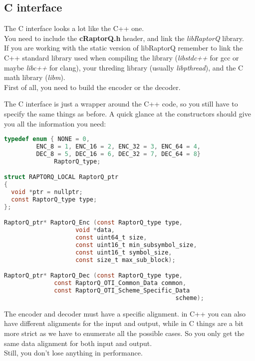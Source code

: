 \documentclass[11pt,a4paper]{refart}
\begin{document}
\subsection{C interface}
The C interface looks a lot like the C++ one.\\
You need to include the \textbf{cRaptorQ.h} header, and link the \textit{libRaptorQ} library.\\
If you are working with the static version of libRaptorQ remember to link the C++ standard library used when
compiling the library (\textit{libstdc++} for gcc or maybe \textit{libc++} for clang), your threding library (usually \textit{libpthread}), and the C math library (\textit{libm}).\\

First of all, you need to build the encoder or the decoder.

The C interface is just a wrapper around the C++ code, so you still have to specify the same things as before.
A quick glance at the constructors should give you all the information you need:

\begin{lstlisting}[language=C]
typedef enum { NONE = 0,
         ENC_8 = 1, ENC_16 = 2, ENC_32 = 3, ENC_64 = 4,
         DEC_8 = 5, DEC_16 = 6, DEC_32 = 7, DEC_64 = 8}
              RaptorQ_type;

struct RAPTORQ_LOCAL RaptorQ_ptr
{
  void *ptr = nullptr;
  const RaptorQ_type type;
};

RaptorQ_ptr* RaptorQ_Enc (const RaptorQ_type type,
                    void *data,
                    const uint64_t size,
                    const uint16_t min_subsymbol_size,
                    const uint16_t symbol_size,
                    const size_t max_sub_block);

RaptorQ_ptr* RaptorQ_Dec (const RaptorQ_type type,
              const RaptorQ_OTI_Common_Data common,
              const RaptorQ_OTI_Scheme_Specific_Data
                                                scheme);
\end{lstlisting}

The encoder and decoder must have a specific alignment. in C++ you can also have different
alignments for the input and output, while in C things are a bit more strict as we have to enumerate
all the possible cases. So you only get the same data alignment for both input and output.\\
Still, you don't lose anything in performance.\\
\end{document}
